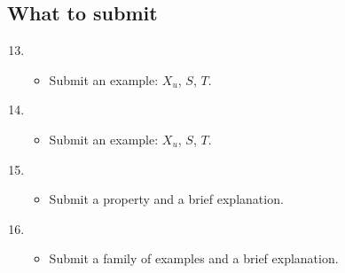 \subsection*{What to submit}
\begin{enumerate}[{Page} 1:]
\setcounter{enumi}{12}
\item
\begin{itemize} \item Submit an example: $X_u$, $S$, $T$. \end{itemize}

\item 
\begin{itemize} \item  Submit an example: $X_u$, $S$, $T$. \end{itemize}

\item 
\begin{itemize} \item Submit a property and a brief explanation. \end{itemize}

\item
\begin{itemize} \item  Submit a family of examples and a brief explanation. \end{itemize}
\end{enumerate}
